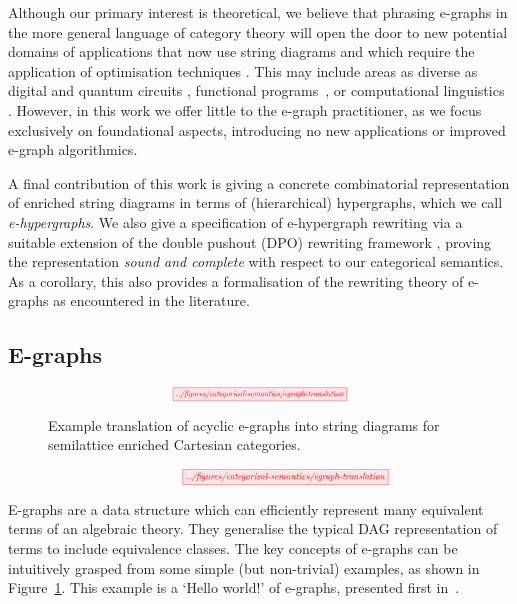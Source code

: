 Although our primary interest is theoretical, we believe that phrasing e-graphs in the more general language of category theory will open the door to new potential domains of applications that now use string diagrams and which require the application of optimisation techniques \cite{Selinger_2010, Hasegawa-traced}. 
This may include areas as diverse as digital \cite{ghica_compositional_2023} and quantum circuits
\cite{coecke_interacting_2011,ZX}, functional programs~\cite{ghica-zanassi2023string}, or computational linguistics \cite{wazni_quantum_2022,coecke_lambek_2013}.  
However, in this work we offer little to the e-graph practitioner, as we focus exclusively on foundational aspects, introducing no new applications or improved e-graph algorithmics. 

A final contribution of this work is giving a concrete combinatorial representation of enriched string diagrams in terms of (hierarchical)  hypergraphs, which we call \textit{e-hypergraphs}.  We also give a specification of e-hypergraph rewriting via a suitable extension of the double pushout (DPO) rewriting framework 
\cite{dpo, bonchi_string_2022-1,bonchi_string_2022-2,bonchi_string_2022},  proving the representation \textit{sound and complete} with respect to our categorical semantics.  As a corollary, this also provides a formalisation of the rewriting theory of e-graphs as encountered in the literature. 

\subsection{E-graphs}

\ifdefined \ONECOLUMN
\begin{figure}
	\[
		\scalebox{0.55}{
		\tikzfig{../figures/categorical-semantics/egraph-translation}
		}
	\]
	\caption{Example translation of acyclic e-graphs into string diagrams for semilattice enriched Cartesian categories. }
	\label{fig:e-graph-example}
	\end{figure}
\else
\begin{figure*}
\[
	\hspace{1.3cm}
    \scalebox{0.65}{
    \tikzfig{../figures/categorical-semantics/egraph-translation}
    }
\]
\caption{Example translation of acyclic e-graphs into string diagrams for semilattice enriched Cartesian categories. }
\label{fig:e-graph-example}
\end{figure*}
\fi

E-graphs are a data structure which can efficiently represent many equivalent terms of an algebraic theory.  They generalise the typical DAG representation of terms to include equivalence classes. 
The key concepts of e-graphs can be intuitively grasped from some simple (but non-trivial) examples, as shown in Figure~\ref{fig:e-graph-example}.
This example is a `Hello world!' of e-graphs, presented first in~\cite{EggPaper}.

